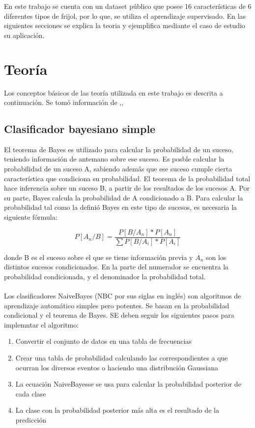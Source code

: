 \documentclass[conference]{IEEEtran}
\begin{document}
En este trabajo se cuenta con un dataset público que posee 16 características de 6 diferentes tipos de frijol, por lo que, se utiliza el aprendizaje supervisado. En las siguientes secciones se explica la teoria y ejemplifica mediante el caso de estudio su aplicación. 

\section{Teoría}
Los conceptos básicos de las teoría utilizada en este trabajo es descrita a continuación. Se tomó información de \cite{b1},\cite{b2}, \cite{b3}
\subsection{Clasificador bayesiano simple}
El teorema de Bayes es utilizado para calcular la probabilidad de un suceso, teniendo información de antemano sobre ese suceso. Es posble calcular la probabilidad de un suceso A, sabiendo además que ese suceso cumple cierta característica que condiciona su probabilidad. El teorema de la probabilidad total hace inferencia sobre un suceso B, a partir de los resultados de los sucesos A. Por su parte, Bayes calcula la probabilidad de A condicionado a B. Para calcular la probabilidad tal como la definió Bayes en este tipo de sucesos, es necesaria la siguiente fórmula: 

\begin{equation}
P[A_n/B]= \frac{P[B/A_n]*P[A_n]}{\sum P[B/A_i]*P[A_i]}
\end{equation}

donde B es el suceso sobre el que se tiene información previa y $A_n$ son los distintos sucesos condicionados. En la parte del numerador se encuentra la probabilidad condicionada, y el denominador la probabilidad total. \\
\\
Los clasificadores NaiveBayes (NBC por sus siglas en inglés) son algoritmos de aprendizaje automático simples pero potentes. Se basan en la probabilidad condicional y el teorema de Bayes. SE deben seguir los siguientes pasos para implemntar el algoritmo: 
\begin{enumerate}
\item Convertir el conjunto de datos en una tabla de frecuencias
\item Crear una tabla de probabilidad calculando las correspondientes a que ocurran los diversos eventos o haciendo una distribución Gaussiana
\item La ecuación NaiveBayesse se usa para calcular la probabilidad posterior de cada clase
\item La clase con la probabilidad posterior más alta es el resultado de la predicción
\end{enumerate}
\end{document}
